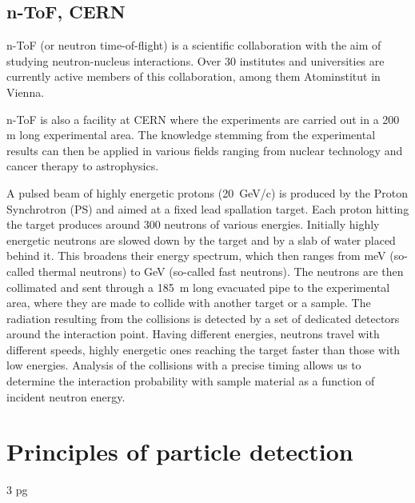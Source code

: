 \documentclass[12pt]{packages/mytustyle}  %
\begin{document}



\subsection{n-ToF, CERN}
n-ToF (or neutron time-of-flight) is a scientific collaboration with the aim of studying neutron-nucleus interactions. Over 30 institutes and universities are currently active members of this collaboration, among them Atominstitut in Vienna.

n-ToF is also a facility at CERN where the experiments are carried out in a 200 m long experimental area. The knowledge stemming from the experimental results can then be applied in various fields ranging from nuclear technology and cancer therapy to astrophysics.

A pulsed beam of highly energetic protons (20~GeV/c) is produced by the Proton Synchrotron (PS) and aimed at a fixed lead spallation target. Each proton hitting the target produces around 300 neutrons of various energies. Initially highly energetic neutrons are slowed down by the target and by a slab of water placed behind it. This broadens their energy spectrum, which then ranges from meV (so-called thermal neutrons) to GeV (so-called fast neutrons). The neutrons are then collimated and sent through a 185~m long evacuated pipe to the experimental area, where they are made to collide with another target or a sample. The radiation resulting from the collisions is detected by a set of dedicated detectors around the interaction point. Having different energies, neutrons travel with different speeds, highly energetic ones reaching the target faster than those with low energies. Analysis of the collisions with a precise timing allows us to determine the interaction probability with sample material as a function of incident neutron energy.




\section{Principles of particle detection}
 3 pg



\end{document}
